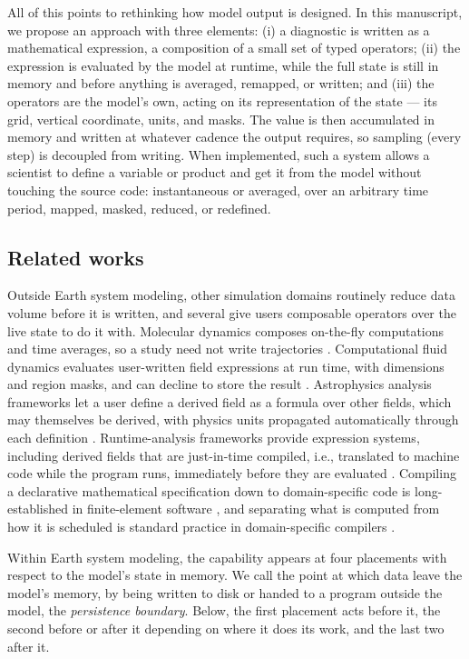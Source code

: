 \documentclass[gmd, manuscript]{copernicus}
\begin{document}
All of this points to rethinking how model output is designed. In this manuscript, we propose an approach with three elements: (i) a diagnostic is written as a mathematical expression, a composition of a small set of typed operators; (ii) the expression is evaluated by the model at runtime, while the full state is still in memory and before anything is averaged, remapped, or written; and (iii) the operators are the model's own, acting on its representation of the state --- its grid, vertical coordinate, units, and masks. The value is then accumulated in memory and written at whatever cadence the output requires, so sampling (every step) is decoupled from writing. When implemented, such a system allows a scientist to define a variable or product and get it from the model without touching the source code: instantaneous or averaged, over an arbitrary time period, mapped, masked, reduced, or redefined.

\subsection{Related works}
\label{sec:related_works}

Outside Earth system modeling, other simulation domains routinely reduce data volume before it is written, and several give users composable operators over the live state to do it with.
Molecular dynamics composes on-the-fly computations and time averages, so a study need not write trajectories \citep{thompson_lammps_2022}. Computational fluid dynamics evaluates user-written field expressions at run time, with dimensions and region masks, and can decline to store the result \citep{weller_tensorial_1998}. Astrophysics analysis frameworks let a user define a derived field as a formula over other fields, which may themselves be derived, with physics units propagated automatically through each definition \citep{turk_yt_2011}. Runtime-analysis frameworks provide expression systems, including derived fields that are just-in-time compiled, i.e., translated to machine code while the program runs, immediately before they are evaluated \citep{ayachit_paraview_2015,childs_ascent_2022,godoy_adios_2020}. Compiling a declarative mathematical specification down to domain-specific code is long-established in finite-element software \citep{alnaes_unified_2014}, and separating what is computed from how it is scheduled is standard practice in domain-specific compilers \citep{ragan-kelley_halide_2013}.

Within Earth system modeling, the capability appears at four placements with respect to the model's state in memory. We call the point at which data leave the model's memory, by being written to disk or handed to a program outside the model, the \emph{persistence boundary}. Below, the first placement acts before it, the second before or after it depending on where it does its work, and the last two after it.
\end{document}
